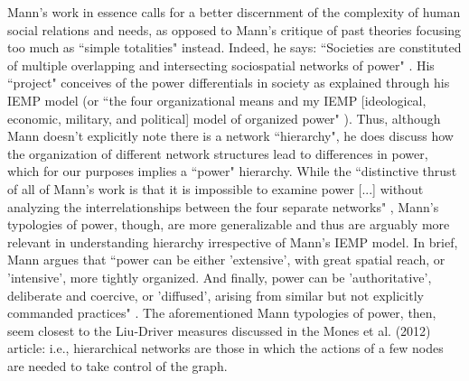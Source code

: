 \documentclass[3p,times]{elsarticle}
\begin{document}
Mann's work in essence calls for a better discernment of the complexity of human social relations and needs, as opposed to Mann’s critique of past theories focusing too much as ``simple totalities" instead. Indeed, he says: ``Societies are constituted of multiple overlapping and intersecting sociospatial networks of power" \cite[p. 1]{mann1986sources}. 
His ``project" conceives of the power differentials in society as explained through his IEMP model (or ``the four organizational means and my IEMP [ideological, economic, military, and political] model of organized power" \cite[p. 2-3]{mann1986sources}). Thus, although Mann doesn't explicitly note there is a network ``hierarchy", 
he does discuss how the organization of different network structures lead to differences in power, which for our purposes implies a ``power" hierarchy. While the ``distinctive thrust of all of Mann's work is that it is impossible to examine power [...] without analyzing the interrelationships between the four separate networks" \cite[p. 339]{schroeder2007mann}, Mann's typologies of power, though, are more generalizable and thus are arguably more relevant in understanding hierarchy irrespective of Mann's IEMP model. In brief, Mann argues that ``power can be either 'extensive', with great spatial reach, or 'intensive', more tightly organized. And finally, power can be 'authoritative', deliberate and coercive, or 'diffused', arising from similar but not explicitly commanded practices" \cite[p. 340]{schroeder2007mann}. 
The aforementioned Mann \cite{mann1986sources} typologies of power, then, seem closest to the Liu-Driver measures discussed in the Mones et al. (2012) article: i.e., hierarchical networks are those in which the actions of a few nodes are needed to take control of the graph. 
\end{document}
